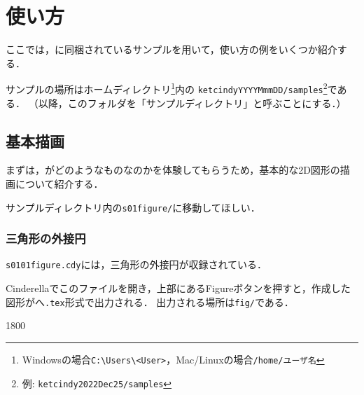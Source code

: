 
\chapter{使い方}

ここでは，{\ketcindy}に同梱されているサンプルを用いて，使い方の例をいくつか紹介する．

サンプルの場所はホームディレクトリ\footnote{Windowsの場合\verb|C:\Users\<User>|，Mac/Linuxの場合\verb|/home/ユーザ名|}内の
\verb|ketcindyYYYYMmmDD/samples|\footnote{例: \verb|ketcindy2022Dec25/samples|}である．
（以降，このフォルダを「サンプルディレクトリ」と呼ぶことにする．）

\section{基本描画}
まずは，{\ketcindy}がどのようなものなのかを体験してもらうため，基本的な2D図形の描画について紹介する．

サンプルディレクトリ内の\verb|s01figure/|に移動してほしい．

\subsection{三角形の外接円}
\verb|s0101figure.cdy|には，三角形の外接円が収録されている．

Cinderellaでこのファイルを開き，上部にあるFigureボタンを押すと，作成した図形がへ\verb|.tex|形式で出力される．
出力される場所は\verb|fig/|である．

\begin{layer}{180}{0}
\end{layer}

